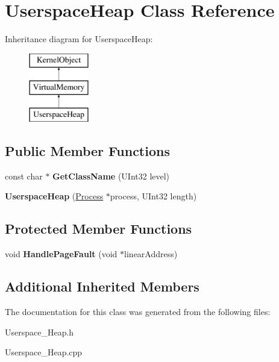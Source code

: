 \hypertarget{class_userspace_heap}{}\section{Userspace\+Heap Class Reference}
\label{class_userspace_heap}
Inheritance diagram for Userspace\+Heap\+:\begin{figure}[H]
\begin{center}
\leavevmode
\includegraphics[height=3.000000cm]{class_userspace_heap}
\end{center}
\end{figure}
\subsection*{Public Member Functions}
\begin{DoxyCompactItemize}
\item 
\mbox{\label{class_userspace_heap_a9d9c95232dc5799c1fb0ec5153565ea9}} 
const char $\ast$ {\bfseries Get\+Class\+Name} (U\+Int32 level)
\item 
\mbox{\label{class_userspace_heap_a28bdaadfa583bd4bbcec7c9e04c31837}} 
{\bfseries Userspace\+Heap} (\hyperlink{class_process}{Process} $\ast$process, U\+Int32 length)
\end{DoxyCompactItemize}
\subsection*{Protected Member Functions}
\begin{DoxyCompactItemize}
\item 
\mbox{\label{class_userspace_heap_a9163d0a1ce61ba54e0d18135e37484d6}} 
void {\bfseries Handle\+Page\+Fault} (void $\ast$linear\+Address)
\end{DoxyCompactItemize}
\subsection*{Additional Inherited Members}


The documentation for this class was generated from the following files\+:\begin{DoxyCompactItemize}
\item 
Userspace\+\_\+\+Heap.\+h\item 
Userspace\+\_\+\+Heap.\+cpp\end{DoxyCompactItemize}
